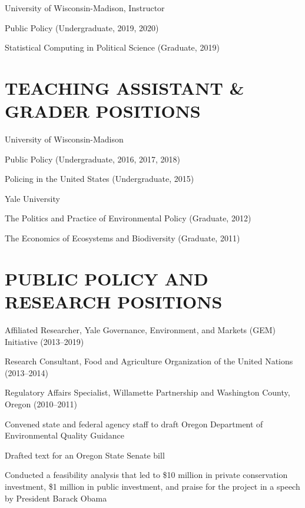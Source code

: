 \documentclass[11pt,]{article}
\renewenvironment{itemize}{
  \begin{list}{}{
    \setlength{\leftmargin}{1.5em}
  }
}{
  \end{list}
}
\begin{document}
University of Wisconsin-Madison, Instructor

\begin{itemize}
\item
  Public Policy (Undergraduate, 2019, 2020)
\item
  Statistical Computing in Political Science (Graduate, 2019)
\end{itemize}

\hypertarget{teaching-assistant-grader-positions}{%
\section{TEACHING ASSISTANT \& GRADER
POSITIONS}\label{teaching-assistant-grader-positions}}

University of Wisconsin-Madison

\begin{itemize}
\item
  Public Policy (Undergraduate, 2016, 2017, 2018)
\item
  Policing in the United States (Undergraduate, 2015)
\end{itemize}

Yale University

\begin{itemize}
\item
  The Politics and Practice of Environmental Policy (Graduate, 2012)
\item
  The Economics of Ecosystems and Biodiversity (Graduate, 2011)
\end{itemize}

\hypertarget{public-policy-and-research-positions}{%
\section{PUBLIC POLICY AND RESEARCH
POSITIONS}\label{public-policy-and-research-positions}}

Affiliated Researcher, Yale Governance, Environment, and Markets (GEM)
Initiative (2013--2019)

Research Consultant, Food and Agriculture Organization of the United
Nations (2013--2014)

Regulatory Affairs Specialist, Willamette Partnership and Washington
County, Oregon (2010--2011)

\begin{itemize}
\item
  Convened state and federal agency staff to draft Oregon Department of
  Environmental Quality Guidance
\item
  Drafted text for an Oregon State Senate bill
\item
  Conducted a feasibility analysis that led to \$10 million in private
  conservation investment, \$1 million in public investment, and praise
  for the project in a speech by President Barack Obama
\end{itemize}
\end{document}
